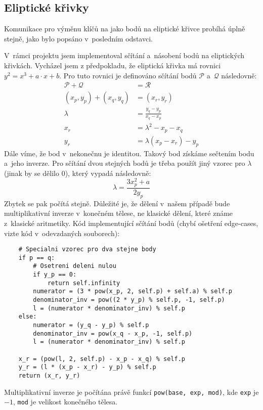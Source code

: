 \documentclass[11pt, a4paper]{article}
\begin{document}
\subsection{Eliptické křivky}\label{kap:elipticke_krivky}

Komunikace pro výměnu klíčů na jako bodů na eliptické křivce probíhá úplně stejně, jako bylo popsáno v~posledním odstavci.

V~rámci projektu jsem implementoval sčítání a~násobení bodů na eliptických křivkách.
Vycházel jsem z předpokladu, že eliptická křivka má rovnici $y^2 = x^3 + a\cdot x + b$.
Pro tuto rovnici je definováno sčítání bodů $\mathcal{P}$ a~$\mathcal{Q}$ následovně:
\begin{align*}
        \mathcal{P} + \mathcal{Q} &= \mathcal{R} \\
        (x_p, y_p) + (x_q, y_q) &= (x_r, y_r)\\
        \lambda &= \frac{y_q - y_p}{x_q - x_p} \\
        x_r &= \lambda^2 - x_p - x_q \\
        y_r &= \lambda (x_p - x_r) - y_p 
\end{align*}
Dále víme, že bod v~nekonečnu je identitou.
Takový bod získáme sečtením bodu a~jeho inverze.
Pro sčítání dvou stejných bodů je třeba použít jiný vzorec pro $\lambda$ (jinak by se dělilo 0), který vypadá následovně:
\[
    \lambda = \frac{3x^2_p + a}{2y_p}
\]
Zbytek se pak počítá stejně.
Důležité je, že dělení v~našem případě bude multiplikativní inverze v~konečném tělese, ne klasické dělení, které známe z~klasické aritmetiky. 
Kód implementující sčítání bodů (chybí ošetření edge-cases, vizte kód v~odevzdaných souborech):
\begin{verbatim}
    # Specialni vzorec pro dva stejne body
    if p == q:
        # Osetreni deleni nulou
        if y_p == 0:
            return self.infinity
        numerator = (3 * pow(x_p, 2, self.p) + self.a) % self.p
        denominator_inv = pow((2 * y_p) % self.p, -1, self.p)
        l = (numerator * denominator_inv) % self.p
    else:
        numerator = (y_q - y_p) % self.p
        denominator_inv = pow(x_q - x_p, -1, self.p)
        l = (numerator * denominator_inv) % self.p

    x_r = (pow(l, 2, self.p) - x_p - x_q) % self.p
    y_r = (l * (x_p - x_r) - y_p) % self.p
    return (x_r, y_r)
\end{verbatim}
Multiplikativní inverze je počítána právě funkcí \texttt{pow(base, exp, mod)}, kde \texttt{exp} je $-1$, \texttt{mod} je velikost konečného tělesa.
\end{document}
